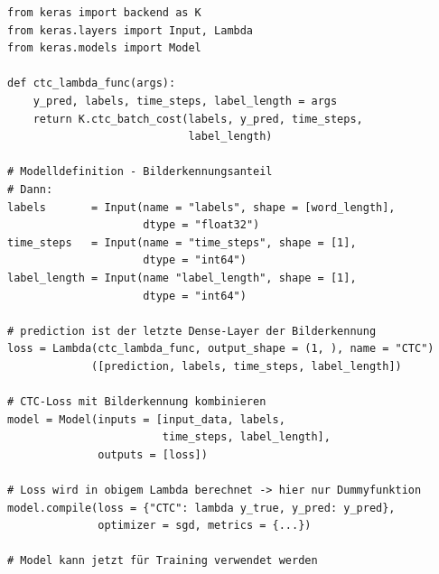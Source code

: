 \begin{code}
\begin{verbatim}
from keras import backend as K
from keras.layers import Input, Lambda
from keras.models import Model

def ctc_lambda_func(args):
    y_pred, labels, time_steps, label_length = args
    return K.ctc_batch_cost(labels, y_pred, time_steps,
                            label_length)

# Modelldefinition - Bilderkennungsanteil
# Dann:
labels       = Input(name = "labels", shape = [word_length],
                     dtype = "float32")
time_steps   = Input(name = "time_steps", shape = [1],
                     dtype = "int64")
label_length = Input(name "label_length", shape = [1],
                     dtype = "int64")

# prediction ist der letzte Dense-Layer der Bilderkennung
loss = Lambda(ctc_lambda_func, output_shape = (1, ), name = "CTC")
             ([prediction, labels, time_steps, label_length])

# CTC-Loss mit Bilderkennung kombinieren
model = Model(inputs = [input_data, labels,
                        time_steps, label_length],
              outputs = [loss])

# Loss wird in obigem Lambda berechnet -> hier nur Dummyfunktion
model.compile(loss = {"CTC": lambda y_true, y_pred: y_pred},
              optimizer = sgd, metrics = {...})

# Model kann jetzt für Training verwendet werden
\end{verbatim}
\label{daten:textklassifizierung:training}
\end{code}


